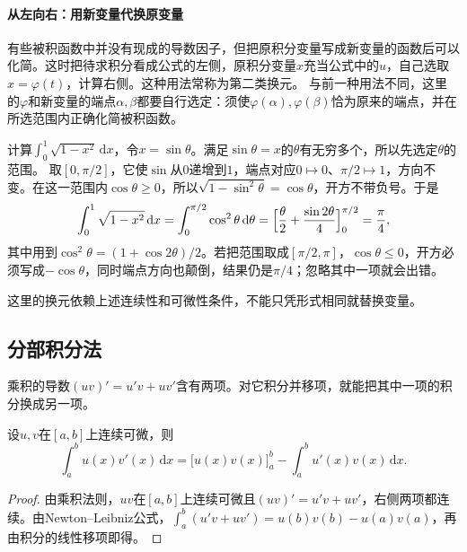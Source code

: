 \paragraph{从左向右：用新变量代换原变量}
有些被积函数中并没有现成的导数因子，但把原积分变量写成新变量的函数后可以化简。这时把待求积分看成公式的左侧，原积分变量$x$充当公式中的$u$，自己选取$x=\varphi(t)$，计算右侧。这种用法常称为第二类换元。
与前一种用法不同，这里的$\varphi$和新变量的端点$\alpha,\beta$都要自行选定：须使$\varphi(\alpha),\varphi(\beta)$恰为原来的端点，并在所选范围内正确化简被积函数。

\begin{example}[四分之一单位圆的面积]
\label{ex:ru-quarter-circle-area}
计算$\int_0^1\sqrt{1-x^2}\,\mathrm dx$，令$x=\sin\theta$。满足$\sin\theta=x$的$\theta$有无穷多个，所以先选定$\theta$的范围。
取$[0,\pi/2]$，它使$\sin$从$0$递增到$1$，端点对应$0\mapsto0$、$\pi/2\mapsto1$，方向不变。在这一范围内$\cos\theta\geq0$，所以$\sqrt{1-\sin^2\theta}=\cos\theta$，开方不带负号。于是
\[
 \int_0^1\sqrt{1-x^2}\,\mathrm dx=\int_0^{\pi/2}\cos^2\theta\,\mathrm d\theta=\Bigl[\frac\theta2+\frac{\sin2\theta}4\Bigr]_0^{\pi/2}=\frac\pi4,
\]
其中用到$\cos^2\theta=(1+\cos2\theta)/2$。若把范围取成$[\pi/2,\pi]$，$\cos\theta\leq0$，开方必须写成$-\cos\theta$，同时端点方向也颠倒，结果仍是$\pi/4$；忽略其中一项就会出错。
\end{example}
这里的换元依赖上述连续性和可微性条件，不能只凭形式相同就替换变量。

\subsection{分部积分法}
\label{sec:ru-integration-by-parts}

乘积的导数$(uv)'=u'v+uv'$含有两项。对它积分并移项，就能把其中一项的积分换成另一项。
\begin{theorem}[分部积分公式]
\label{thm:ru-integration-by-parts}
设$u,v$在$[a,b]$上连续可微，则
\begin{equation}
 \int_a^bu(x)v'(x)\,\mathrm dx=\bigl[u(x)v(x)\bigr]_a^b-\int_a^bu'(x)v(x)\,\mathrm dx.
 \label{eq:ru-integration-by-parts}
\end{equation}
\BookEquationAliases{\label{eq:analysis-integration-by-parts}}
\end{theorem}
\begin{proof}
由乘积法则，$uv$在$[a,b]$上连续可微且$(uv)'=u'v+uv'$，右侧两项都连续。由Newton--Leibniz公式，$\int_a^b(u'v+uv')=u(b)v(b)-u(a)v(a)$，再由积分的线性移项即得。
\end{proof}

